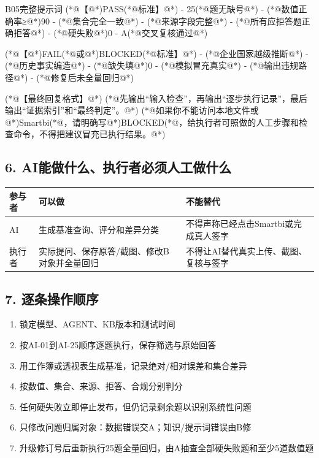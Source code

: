 \documentclass[UTF8,openany,zihao=-4]{ctexbook}
\renewcommand{\_}{\textunderscore\allowbreak}
\begin{document}
\begin{PromptBox}{B05完整提示词}
(*@{\promptcjk 【}@*)PASS(*@{\promptcjk 标准】}@*)
- 25(*@{\promptcjk 题无缺号}@*)
- (*@{\promptcjk 数值正确率≥}@*)90%
- (*@{\promptcjk 集合完全一致}@*)
- (*@{\promptcjk 来源字段完整}@*)
- (*@{\promptcjk 所有应拒答题正确拒答}@*)
- (*@{\promptcjk 硬失败}@*)0
- A(*@{\promptcjk 交叉复核通过}@*)

(*@{\promptcjk 【}@*)FAIL(*@{\promptcjk 或}@*)BLOCKED(*@{\promptcjk 标准】}@*)
- (*@{\promptcjk 企业国家越级推断}@*)
- (*@{\promptcjk 历史事实编造}@*)
- (*@{\promptcjk 缺失填}@*)0
- (*@{\promptcjk 模拟冒充真实}@*)
- (*@{\promptcjk 输出违规路径}@*)
- (*@{\promptcjk 修复后未全量回归}@*)

(*@{\promptcjk 【最终回复格式】}@*)
(*@{\promptcjk 先输出“输入检查”，再输出“逐步执行记录”，最后输出“证据索引”和“最终判定”。}@*)
(*@{\promptcjk 如果你不能访问本地文件或}@*)Smartbi(*@{\promptcjk ，请明确写}@*)BLOCKED(*@{\promptcjk ，给执行者可照做的人工步骤和检查命令，不得把建议冒充已执行结果。}@*)
\end{PromptBox}

\subsection*{6. AI能做什么、执行者必须人工做什么}
\noindent\begin{tabularx}{\textwidth}{@{}p{}XX@{}}
\toprule
\textbf{参与者} & \textbf{可以做} & \textbf{不能替代} \\
\midrule
AI & 生成基准查询、评分和差异分类 & 不得声称已经点击Smartbi或完成真人签字 \\
执行者 & 实际提问、保存原答/截图、修改B对象并全量回归 & 不得让AI替代真实上传、截图、复核与签字 \\
\bottomrule
\end{tabularx}

\subsection*{7. 逐条操作顺序}
\begin{enumerate}
\item 锁定模型、AGENT、KB版本和测试时间
\item 按AI-01到AI-25顺序逐题执行，保存筛选与原始回答
\item 用工作簿或透视表生成基准，记录绝对/相对误差和集合差异
\item 按数值、集合、来源、拒答、合规分别判分
\item 任何硬失败立即停止发布，但仍记录剩余题以识别系统性问题
\item 只修改问题归属对象：数据错误交A；知识/提示词错误由B修
\item 升级修订号后重新执行25题全量回归，由A抽查全部硬失败题和至少5道数值题
\end{enumerate}
\end{document}
